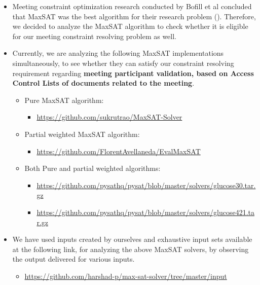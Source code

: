 \begin{spacing}{1.0}
\begin{itemize}
            \item Meeting constraint optimization research conducted by Bofill et al concluded that MaxSAT was the best algorithm for their research problem (\cite{bofill2022}). Therefore, we decided to analyze the MaxSAT algorithm to check whether it is eligible for our meeting constraint resolving problem as well.
            \item Currently, we are analyzing the following MaxSAT implementations simultaneously, to see whether they can satisfy our constraint resolving requirement regarding \textbf{meeting participant validation, based on Access Control Lists of documents related to the meeting}.
                \begin{itemize}
                    \item Pure MaxSAT algorithm: 
                        \begin{itemize}
                            \item \url{https://github.com/sukrutrao/MaxSAT-Solver}
                        \end{itemize}
                    \item Partial weighted MaxSAT algorithm: 
                        \begin{itemize}
                            \item \url{https://github.com/FlorentAvellaneda/EvalMaxSAT}
                        \end{itemize}
                    \item Both Pure and partial weighted algorithms:
                        \begin{itemize}
                            \item \url{https://github.com/pysathq/pysat/blob/master/solvers/glucose30.tar.gz}
                            \item \url{https://github.com/pysathq/pysat/blob/master/solvers/glucose421.tar.gz}
                        \end{itemize}
                \end{itemize}
            \item We have used inputs created by ourselves and exhaustive input sets available at the following link, for analyzing the above MaxSAT solvers, by observing the output delivered for various inputs.
                \begin{itemize}
                    \item \url{https://github.com/harshad-p/max-sat-solver/tree/master/input}
                \end{itemize}
        \end{itemize}
    

\end{spacing}
